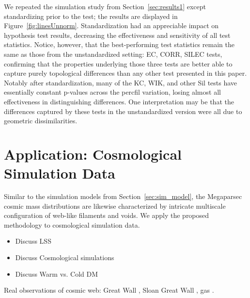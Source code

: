 \documentclass[12pt]{article}
\newcommand{\figref}[1]{Figure~\ref{#1}}
\begin{document}
We repeated the simulation study from Section~\ref{sec:results1} except standardizing prior to the test; the results are displayed in \figref{fig:linesUnnorm}. Standardization had an appreciable impact on hypothesis test results, decreasing the effectiveness and sensitivity of all test statistics. Notice, however, that the best-performing test statistics remain the same as those from the unstandardized setting: EC, CORR, SILEC tests, confirming that the properties underlying those three tests are better able to capture purely topological differences than any other test presented in this paper. Notably after standardization, many of the KC, WIK, and other Sil tests have essentially constant p-values across the percfil variation, losing almost all effectiveness in distinguishing differences. One interpretation may be that the differences captured by these tests in the unstandardized version were all due to geometric dissimilarities.


\section{Application: Cosmological Simulation Data}
\label{sec:application}

Similar to the simulation models from Section~\ref{sec:sim_model}, the Megaparsec cosmic mass distributions are likewise characterized by intricate multiscale configuration of web-like filaments and voids. We apply the proposed methodology to cosmological simulation data.

{\color{red}
\begin{itemize}
\item  Discuss LSS
\item  Discuss Cosmological simulations
\item  Discuss Warm vs. Cold DM
\end{itemize}
Real observations of cosmic web:  Great Wall \citep{geller1989mapping}, Sloan Great Wall \citep{gott2005map}, gas \citep{cantalupo2014cosmic}.}
\end{document}
